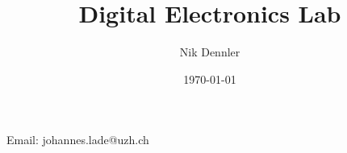 \documentclass[10pt,a4paper]{article}
\author{Nik Dennler}
\title{Digital Electronics Lab}
\date{\today{}}
\begin{document}
	
\begin{titlepage}
	\maketitle
		\begin{center}
			Email: johannes.lade@uzh.ch
		\end{center}
	\thispagestyle{empty}
\end{titlepage}

\tableofcontents
\newpage

	
\end{document}
